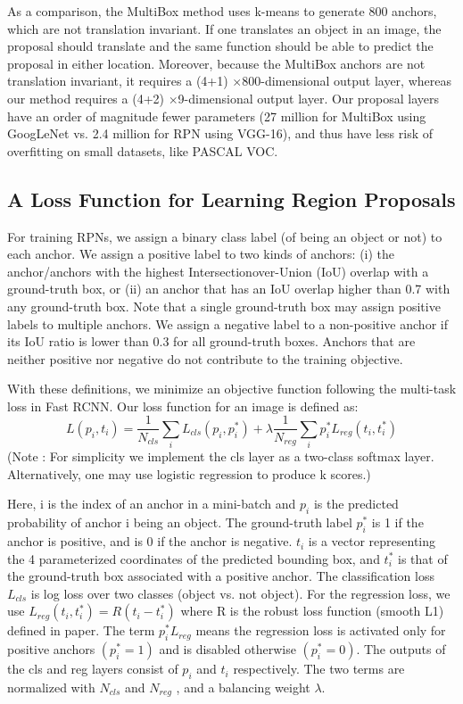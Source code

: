 As a comparison, the MultiBox method uses k-means to generate 800 anchors, which are not
translation invariant. If one translates an object in an image, the proposal should translate and the
same function should be able to predict the proposal in either location. Moreover, because the
MultiBox anchors are not translation invariant, it requires a (4+1) $\times$800-dimensional output layer,
whereas our method requires a (4+2) $\times$9-dimensional output layer. Our proposal layers have an order
of magnitude fewer parameters (27 million for MultiBox using GoogLeNet vs. 2.4 million for
RPN using VGG-16), and thus have less risk of overfitting on small datasets, like PASCAL VOC.

\subsection{A Loss Function for Learning Region Proposals}
For training RPNs, we assign a binary class label (of being an object or not) to each anchor. We
assign a positive label to two kinds of anchors: (i) the anchor/anchors with the highest Intersectionover-Union (IoU) overlap with a ground-truth box, or (ii) an anchor that has an IoU overlap higher
than 0.7 with any ground-truth box. Note that a single ground-truth box may assign positive labels
to multiple anchors. We assign a negative label to a non-positive anchor if its IoU ratio is lower than
0.3 for all ground-truth boxes. Anchors that are neither positive nor negative do not contribute to the
training objective.

With these definitions, we minimize an objective function following the multi-task loss in Fast RCNN. Our loss function for an image is defined as:\[L({p_{i}},{t_{i}}) = \frac{1}{N_{cls}} \sum_{i} L_{cls}(p_{i},p_{i}^{*}) + \lambda \frac{1}{N_{reg}} \sum_{i}p_{i}^{*} L_{reg}(t_{i},t_{i}^{*}) \]
\noindent
(Note : For simplicity we implement the cls layer as a two-class softmax layer. Alternatively, one may use logistic regression to produce k scores.)


Here, i is the index of an anchor in a mini-batch and $p_{i}$ is the predicted probability of anchor i being an object. The ground-truth label $p_{i}^{*}$ is 1 if the anchor is positive, and is 0 if the anchor is negative. $t_{i}$ is a vector representing the 4 parameterized coordinates of the predicted bounding box, and $t_{i}^{*}$ is that of the ground-truth box associated with a positive anchor. The classification loss $L_{cls}$ is log loss over two classes (object vs. not object). For the regression loss, we use $L_{reg} (t_{i} , t_{i}^{*}) = R(t_{i} - t_{i}^{*})$ where R is the robust loss function (smooth L1) defined in paper. The term $p_{i}^{*} L_{reg}$ means the regression loss is activated only for positive anchors $(p_{i}^{*} = 1)$ and is disabled otherwise $(p_{i}^{*} = 0)$. The outputs of the cls and reg layers consist of {$p_{i}$} and {$t_{i}$} respectively. The two terms are normalized with $N_{cls}$ and $N_{reg}$ , and a balancing weight $\lambda$.

